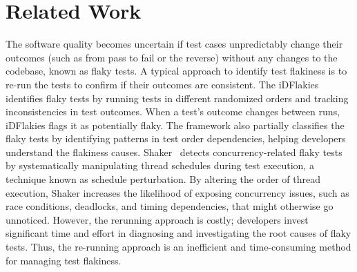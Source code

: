 \section{Related Work}
\label{sec:related-works}

The software quality becomes uncertain if test cases unpredictably change their outcomes (such as from pass to fail or the reverse) without any changes to the codebase, known as flaky tests. A typical approach to identify test flakiness is to re-run the tests to confirm if their outcomes are consistent. The iDFlakies~\cite{lam2019idflakies} identifies flaky tests by running tests in different randomized orders and tracking inconsistencies in test outcomes. When a test’s outcome changes between runs, iDFlakies flags it as potentially flaky. The framework also partially classifies the flaky tests by identifying patterns in test order dependencies, helping developers understand the flakiness causes. Shaker~\cite{silva2020shake} detects concurrency-related flaky tests by systematically manipulating thread schedules during test execution, a technique known as schedule perturbation. By altering the order of thread execution, Shaker increases the likelihood of exposing concurrency issues, such as race conditions, deadlocks, and timing dependencies, that might otherwise go unnoticed. However, the rerunning approach is costly; developers invest significant time and effort in diagnosing and investigating the root causes of flaky tests. Thus, the re-running approach is an inefficient and time-consuming method for managing test flakiness. 

